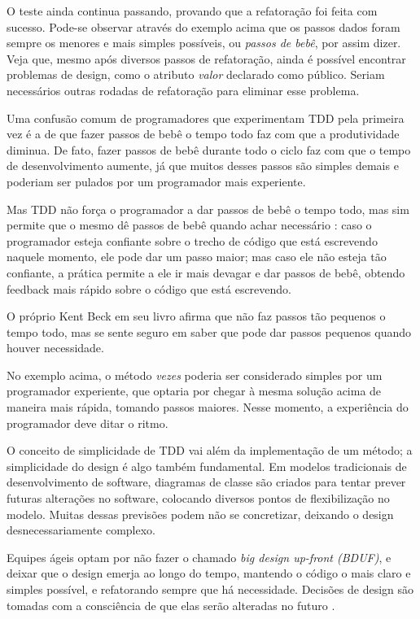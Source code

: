O teste ainda continua passando, provando que a refatoração foi feita com
sucesso. Pode-se observar através do exemplo acima que os passos dados foram
sempre os menores e mais simples possíveis, ou \textit{passos de bebê}, por
assim dizer. Veja que, mesmo após diversos passos de refatoração, ainda é
possível encontrar problemas de design, como o atributo \textit{valor}
declarado como público. Seriam necessários outras rodadas de refatoração para
eliminar esse problema.

Uma confusão comum de programadores que experimentam TDD pela primeira vez é a
de que fazer passos de bebê o tempo todo faz com que a produtividade diminua.
De fato, fazer passos de bebê durante todo o ciclo faz com que o tempo de
desenvolvimento aumente, já que muitos desses passos são simples demais e
poderiam ser pulados por um programador mais experiente. 

Mas TDD não força o programador a dar passos de bebê o tempo todo, mas sim
permite que o mesmo dê passos de bebê quando achar necessário
\cite{TDDByExample}: caso o programador esteja confiante sobre o trecho de
código  que está escrevendo naquele momento, ele pode dar um passo maior;  mas
caso ele não esteja tão confiante, a prática permite a ele ir mais devagar e 
dar passos de bebê, obtendo feedback mais rápido sobre o código que está
escrevendo.

O próprio Kent Beck em seu livro afirma que não faz passos tão pequenos o tempo
todo, mas se sente seguro em saber que pode dar passos pequenos quando houver
necessidade.

No exemplo acima, o método \textit{vezes} poderia ser considerado simples por
um programador experiente, que optaria por chegar à mesma solução acima de
maneira mais rápida, tomando passos maiores. Nesse momento, a experiência do
programador deve ditar o ritmo.

O conceito de simplicidade de TDD vai além da implementação de um método; a
simplicidade do design é algo também fundamental. Em modelos tradicionais de
desenvolvimento de software, diagramas de classe são criados para tentar prever
futuras alterações no software, colocando diversos pontos de flexibilização no
modelo. Muitas dessas previsões podem não se concretizar, deixando o design
desnecessariamente complexo.

Equipes ágeis optam por não fazer o chamado \textit{big design up-front (BDUF)},
e deixar que o design emerja ao longo do tempo, mantendo o código o mais claro e
simples possível, e refatorando sempre que há necessidade. Decisões de
design são tomadas com a consciência de que elas serão alteradas no futuro
\cite{is-design-dead}.

